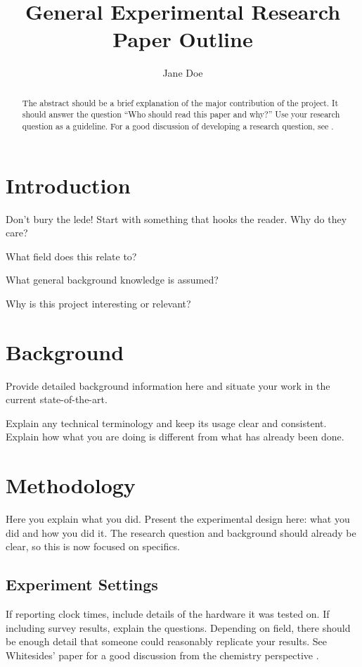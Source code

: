 \documentclass[12pt]{article} %
\author{Jane Doe}
\title{General Experimental Research Paper Outline}
\begin{document}
\maketitle

\begin{abstract}
The abstract should be a brief explanation of the major contribution of the project. It should answer the question ``Who should read this paper and why?'' Use your research question as a guideline. For a good discussion of developing a research question, see \cite{Wright1999}.
\end{abstract}

\section{Introduction}
\label{sec:intro}
Don't bury the lede! Start with something that hooks the reader. Why do they care?

\begin{compactlist}
\item What field does this relate to?
\item What general background knowledge is assumed?
\item Why is this project interesting or relevant?
\end{compactlist}

\section{Background}
\label{sec:background}
Provide detailed background information here and situate your work in the current state-of-the-art.

Explain any technical terminology and keep its usage clear and consistent.
Explain how what you are doing is different from what has already been done.

\section{Methodology}
\label{sec:methods}
Here you explain what you did. Present the experimental design here: what you did and how you did it. The research question and background should already be clear, so this is now focused on specifics.

\subsection{Experiment Settings}
\label{sec:exp}
If reporting clock times, include details of the hardware it was tested on. If including survey results, explain the questions. Depending on field, there should be enough detail that someone could reasonably replicate your results. See Whitesides' paper for a good discussion from the chemistry perspective \cite{Whitesides2004}.
\end{document}
